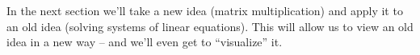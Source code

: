 In the next section we'll take a new idea (matrix multiplication) and apply it to an old idea (solving systems of linear equations). This will allow us to view an old idea in a new way -- and we'll even get to ``visualize'' it.\\

\clearpage

 
 

